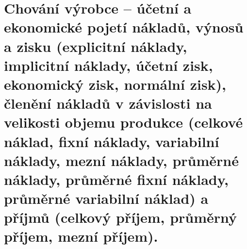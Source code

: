 \clearpage
\section{Chování výrobce – účetní a ekonomické pojetí nákladů, výnosů a zisku (explicitní
náklady, implicitní náklady, účetní zisk, ekonomický zisk, normální zisk), členění
nákladů v závislosti na velikosti objemu produkce (celkové náklad, fixní náklady,
variabilní náklady, mezní náklady, průměrné náklady, průměrné fixní náklady,
průměrné variabilní náklad) a příjmů (celkový příjem, průměrný příjem, mezní příjem).}
